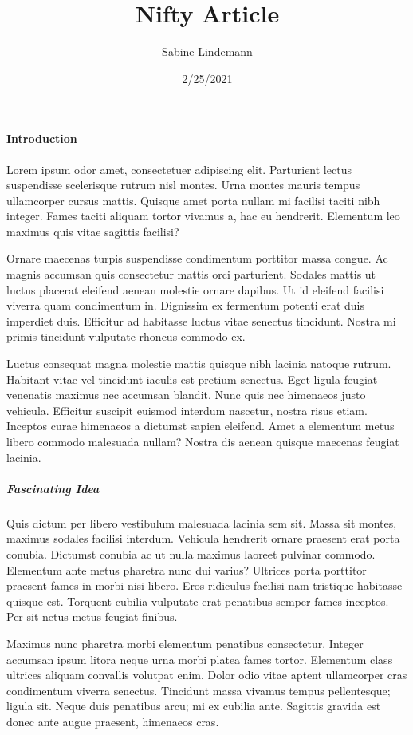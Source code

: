 \documentclass{article}
\title{Nifty Article}
\author{Sabine Lindemann}
\date{2/25/2021}
\begin{document}
\maketitle
\paragraph{Introduction}
Lorem ipsum odor amet, consectetuer adipiscing elit. Parturient lectus suspendisse scelerisque rutrum nisl montes. Urna montes mauris tempus ullamcorper cursus mattis. Quisque amet porta nullam mi facilisi taciti nibh integer. Fames taciti aliquam tortor vivamus a, hac eu hendrerit. Elementum leo maximus quis vitae sagittis facilisi?

Ornare maecenas turpis suspendisse condimentum porttitor massa congue. Ac magnis accumsan quis consectetur mattis orci parturient. Sodales mattis ut luctus placerat eleifend aenean molestie ornare dapibus. Ut id eleifend facilisi viverra quam condimentum in. Dignissim ex fermentum potenti erat duis imperdiet duis. Efficitur ad habitasse luctus vitae senectus tincidunt. Nostra mi primis tincidunt vulputate rhoncus commodo ex.

Luctus consequat magna molestie mattis quisque nibh lacinia natoque rutrum. Habitant vitae vel tincidunt iaculis est pretium senectus. Eget ligula feugiat venenatis maximus nec accumsan blandit. Nunc quis nec himenaeos justo vehicula. Efficitur suscipit euismod interdum nascetur, nostra risus etiam. Inceptos curae himenaeos a dictumst sapien eleifend. Amet a elementum metus libero commodo malesuada nullam? Nostra dis aenean quisque maecenas feugiat lacinia.

\subparagraph{Fascinating Idea}
Quis dictum per libero vestibulum malesuada lacinia sem sit. Massa sit montes, maximus sodales facilisi interdum. Vehicula hendrerit ornare praesent erat porta conubia. Dictumst conubia ac ut nulla maximus laoreet pulvinar commodo. Elementum ante metus pharetra nunc dui varius? Ultrices porta porttitor praesent fames in morbi nisi libero. Eros ridiculus facilisi nam tristique habitasse quisque est. Torquent cubilia vulputate erat penatibus semper fames inceptos. Per sit netus metus feugiat finibus.

Maximus nunc pharetra morbi elementum penatibus consectetur. Integer accumsan ipsum litora neque urna morbi platea fames tortor. Elementum class ultrices aliquam convallis volutpat enim. Dolor odio vitae aptent ullamcorper cras condimentum viverra senectus. Tincidunt massa vivamus tempus pellentesque; ligula sit. Neque duis penatibus arcu; mi ex cubilia ante. Sagittis gravida est donec ante augue praesent, himenaeos cras.
\end{document}
